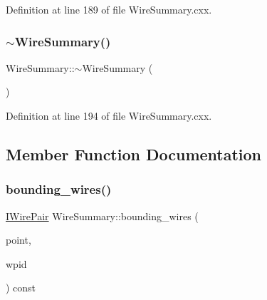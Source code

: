 Definition at line 189 of file Wire\+Summary.\+cxx.

\mbox{\label{class_wire_cell_1_1_wire_summary_aa01b2eff501094581e90221bea06e3c5}} 
\subsubsection{\texorpdfstring{$\sim$\+Wire\+Summary()}{~WireSummary()}}
{\footnotesize\ttfamily Wire\+Summary\+::$\sim$\+Wire\+Summary (\begin{DoxyParamCaption}{ }\end{DoxyParamCaption})\hspace{0.3cm}{\ttfamily [virtual]}}



Definition at line 194 of file Wire\+Summary.\+cxx.



\subsection{Member Function Documentation}
\mbox{\label{class_wire_cell_1_1_wire_summary_a0dd41ce408d6cf49e923a1bd0a893038}} 
\subsubsection{\texorpdfstring{bounding\+\_\+wires()}{bounding\_wires()}}
{\footnotesize\ttfamily \hyperlink{namespace_wire_cell_ad5f0e75d8f0e885d9ae4e9154e812d76}{I\+Wire\+Pair} Wire\+Summary\+::bounding\+\_\+wires (\begin{DoxyParamCaption}\item[{const \hyperlink{namespace_wire_cell_ab2b2565fa6432efbb4513c14c988cda9}{Point} \&}]{point,  }\item[{\hyperlink{class_wire_cell_1_1_wire_plane_id}{Wire\+Plane\+Id}}]{wpid }\end{DoxyParamCaption}) const\hspace{0.3cm}{\ttfamily [virtual]}}

